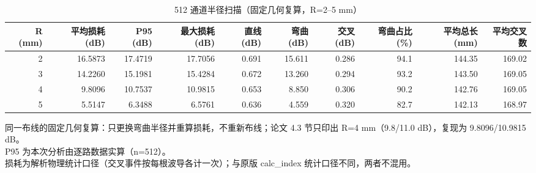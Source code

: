 \begin{table}[htbp]
  \centering
  \caption{512 通道半径扫描（固定几何复算，R=2–5 mm）}
  \label{tab:radius-sweep}
  \begin{tabular}{rrrrrrrrrr}
    \toprule
    R (mm) & 平均损耗 (dB) & P95 (dB) & 最大损耗 (dB) & 直线 (dB) & 弯曲 (dB) & 交叉 (dB) & 弯曲占比 (\%) & 平均总长 (mm) & 平均交叉数 \\
    \midrule
    2 & 16.5873 & 17.4719 & 17.7056 & 0.691 & 15.611 & 0.286 & 94.1 & 144.35 & 169.02 \\
    3 & 14.2260 & 15.1981 & 15.4284 & 0.672 & 13.260 & 0.294 & 93.2 & 143.50 & 169.05 \\
    4 & 9.8096 & 10.7537 & 10.9815 & 0.653 & 8.850 & 0.306 & 90.2 & 142.76 & 169.05 \\
    5 & 5.5147 & 6.3488 & 6.5761 & 0.636 & 4.559 & 0.320 & 82.7 & 142.13 & 168.97 \\
    \bottomrule
  \end{tabular}
  \par\vspace{2pt}
  \begin{flushleft}\footnotesize
  同一布线的固定几何复算：只更换弯曲半径并重算损耗，不重新布线；论文 4.3 节只印出 R=4 mm（9.8/11.0 dB），复现为 9.8096/10.9815 dB。 \\
  P95 为本次分析由逐路数据实算（n=512）。 \\
  损耗为解析物理统计口径（交叉事件按每根波导各计一次）；与原版 calc\_index 统计口径不同，两者不混用。 \\
  \end{flushleft}
\end{table}
